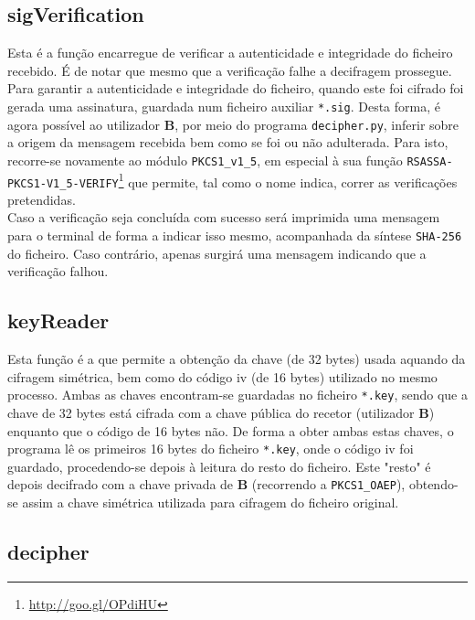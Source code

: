 \documentclass[a4paper,11pt,openright,oneside]{report}
\begin{document}
\subsection{sigVerification}

Esta é a função encarregue de verificar a autenticidade e integridade do ficheiro recebido. É de notar que mesmo que a verificação falhe a decifragem prossegue.\\

Para garantir a autenticidade e integridade do ficheiro, quando este foi cifrado foi gerada uma assinatura, guardada num ficheiro auxiliar \verb|*.sig|. Desta forma, é agora possível ao utilizador \textbf{B}, por meio do programa \verb|decipher.py|, inferir sobre a origem da mensagem recebida bem como se foi ou não adulterada. Para isto, recorre-se novamente ao módulo \verb|PKCS1_v1_5|, em especial à sua função \verb|RSASSA-PKCS1-V1_5-VERIFY|\footnote{\url{http://goo.gl/OPdiHU}} que permite, tal como o nome indica, correr as verificações pretendidas.\\

Caso a verificação seja concluída com sucesso será imprimida uma mensagem para o terminal de forma a indicar isso mesmo, acompanhada da síntese \verb|SHA-256| do ficheiro. Caso contrário, apenas surgirá uma mensagem indicando que a verificação falhou.

\subsection{keyReader}

Esta função é a que permite a obtenção da chave (de 32 bytes) usada aquando da cifragem simétrica, bem como do código iv (de 16 bytes) utilizado no mesmo processo. Ambas as chaves encontram-se guardadas no ficheiro \verb|*.key|, sendo que a chave de 32 bytes está cifrada com a chave pública do recetor (utilizador \textbf{B}) enquanto que o código de 16 bytes não. De forma a obter ambas estas chaves, o programa lê os primeiros 16 bytes do ficheiro \verb|*.key|, onde o código iv foi guardado, procedendo-se depois à leitura do resto do ficheiro. Este "resto" é depois decifrado com a chave privada de \textbf{B} (recorrendo a \verb|PKCS1_OAEP|), obtendo-se assim a chave simétrica utilizada para cifragem do ficheiro original.

\subsection{decipher}
\end{document}
